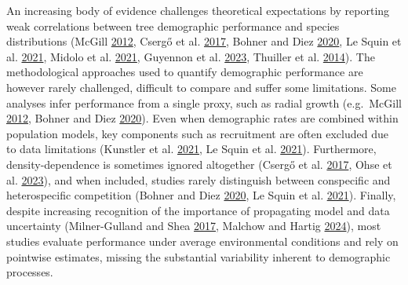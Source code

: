 \documentclass[12pt]{article}
\begin{document}
An increasing body of evidence challenges theoretical expectations by
reporting weak correlations between tree demographic performance and
species distributions (McGill \protect\hyperlink{ref-McGill2012}{2012},
Csergő et al. \protect\hyperlink{ref-Csergo2017}{2017}, Bohner and Diez
\protect\hyperlink{ref-bohner2020}{2020}, Le Squin et al.
\protect\hyperlink{ref-LeSquin2021}{2021}, Midolo et al.
\protect\hyperlink{ref-Midolo2021}{2021}, Guyennon et al.
\protect\hyperlink{ref-Guyennon2023}{2023}, Thuiller et al.
\protect\hyperlink{ref-Thuiller2014}{2014}). The methodological
approaches used to quantify demographic performance are however rarely
challenged, difficult to compare and suffer some limitations. Some
analyses infer performance from a single proxy, such as radial growth
(e.g.~McGill \protect\hyperlink{ref-McGill2012}{2012}, Bohner and Diez
\protect\hyperlink{ref-bohner2020}{2020}). Even when demographic rates
are combined within population models, key components such as
recruitment are often excluded due to data limitations (Kunstler et al.
\protect\hyperlink{ref-Kunstler2021}{2021}, Le Squin et al.
\protect\hyperlink{ref-LeSquin2021}{2021}). Furthermore,
density-dependence is sometimes ignored altogether (Csergő et al.
\protect\hyperlink{ref-Csergo2017}{2017}, Ohse et al.
\protect\hyperlink{ref-Ohse2023}{2023}), and when included, studies
rarely distinguish between conspecific and heterospecific competition
(Bohner and Diez \protect\hyperlink{ref-bohner2020}{2020}, Le Squin et
al. \protect\hyperlink{ref-LeSquin2021}{2021}). Finally, despite
increasing recognition of the importance of propagating model and data
uncertainty (Milner-Gulland and Shea
\protect\hyperlink{ref-MilnerGulland2017a}{2017}, Malchow and Hartig
\protect\hyperlink{ref-malchow2024calibration}{2024}), most studies
evaluate performance under average environmental conditions and rely on
pointwise estimates, missing the substantial variability inherent to
demographic processes.
\end{document}

